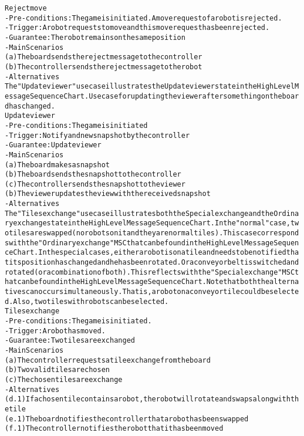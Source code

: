 \begin{alltt}
Reject move
- Pre-conditions: The game is initiated. A move request of a robot is rejected.
- Trigger: A robot requests to move and this move request has been rejected.
- Guarantee: The robot remains on the same position
- Main Scenarios
    (a) The board sends the reject message to the controller
    (b) The controller sends the reject message to the robot
- Alternatives \\

The "Update viewer" use case illustrates the Update viewer state in the High Level Message Sequence Chart. Use case for updating the viewer after something on the board has changed. \\

Update viewer
- Pre-conditions: The game is initiated
- Trigger: Notify and new snapshot by the controller
- Guarantee: Update viewer
- Main Scenarios
    (a) The board makes a snapshot
    (b) The board sends the snapshot to the controller
    (c) The controller sends the snapshot to the viewer
    (b) The viewer updates the view with the received snapshot
- Alternatives \\

The "Tiles exchange" use case illustrates both the Special exchange and the Ordinary exchange state in the High Level Message Sequence Chart. In the "normal" case, two tiles are swapped (no robots on it and they are normal tiles). This case corresponds with the "Ordinary exchange" MSC that can be found in the High Level Message Sequence Chart. In the special cases, either a robot is on a tile and needs to be notified that its position has changed and he has been rotated. Or a conveyor belt is switched and rotated (or a combination of both). This reflects with the "Special exchange" MSC that can be found in the High Level Message Sequence Chart. Note that both the alternatives can occur simultaneously. That is, a robot on a conveyor tile could be selected. Also, two tiles with robots can be selected.\\

Tiles exchange
- Pre-conditions: The game is initiated.
- Trigger:  A robot has moved.
- Guarantee: Two tiles are exchanged
- Main Scenarios
    (a) The controller requests a tile exchange from the board
    (b) Two valid tiles are chosen
    (c) The chosen tiles are exchange
- Alternatives
    (d.1) If a chosen tile contains a robot, the robot will rotate and swaps along with the tile
    (e.1) The board notifies the controller that a robot has been swapped 
    (f.1) The controller notifies the robot that it has been moved \\


\end{alltt}
